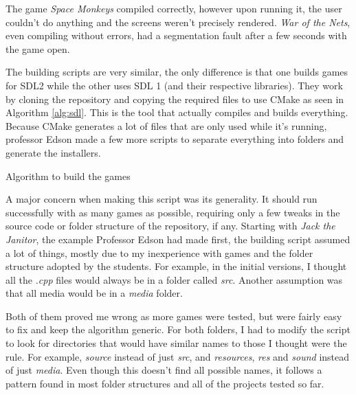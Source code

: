 The game \textit{Space Monkeys} compiled correctly, however upon running it, the user couldn't do anything and the screens weren't precisely rendered. \textit{War of the Nets}, even compiling without errors, had a segmentation fault after a few seconds with the game open.

The building scripts are very similar, the only difference is that one builds games for SDL2 while the other uses SDL 1 (and their respective libraries). They work by cloning the repository and copying the required files to use CMake as seen in Algorithm \ref{alg:sdl}. This is the tool that actually compiles and builds everything. Because CMake generates a lot of files that are only used while it's running, professor Edson made a few more scripts to separate everything into folders and generate the installers.

\begin{algorithm}[h!]
\caption{Algorithm to build the games}
\label{alg:sdl}
\begin{algorithmic}
\Start
{}  
\State {} 
 
 
\State {} 
\State {} 
\State {} 
\State {} 
\End
\end{algorithmic}
\end{algorithm}

A major concern when making this script was its generality. It should run successfully with as many games as possible, requiring only a few tweaks in the source code or folder structure of the repository, if any. Starting with \textit{Jack the Janitor}, the example Professor Edson had made first, the  building script assumed a lot of things, mostly due to my inexperience with games and the folder structure adopted by the students. For example, in the initial versions, I thought all the \textit{.cpp} files would always be in a folder called \textit{src}. Another assumption was that all media would be in a \textit{media} folder.

Both of them proved me wrong as more games were tested, but were fairly easy to fix and keep the algorithm generic. For both folders, I had to modify the script to look for directories that would have similar names to those I thought were the rule. For example, \textit{source} instead of just \textit{src}, and \textit{resources}, \textit{res} and \textit{sound} instead of just \textit{media}. Even though this doesn't find all possible names, it follows a pattern found in most folder structures and all of the projects tested so far.

